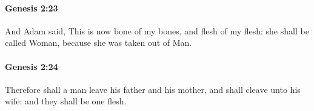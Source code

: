 		\paragraph{Genesis 2:23} %
			\label{GENESIS-2-23}

			And Adam said, This is now bone of my bones, and flesh of my flesh: she shall be called Woman, because she was taken out of Man.


		\paragraph{Genesis 2:24} %
			\label{GENESIS-2-24}

			Therefore shall a man leave his father and his mother, and shall cleave unto his wife: and they shall be one flesh.



